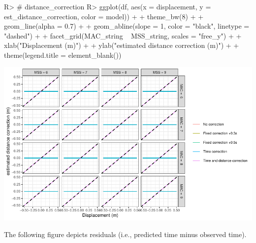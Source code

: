 \documentclass[
]{jss}
\begin{document}
\begin{CodeChunk}
\begin{CodeInput}
R> # distance_correction
R> ggplot(df, aes(x = displacement, y = est_distance_correction, color = model)) +
+   theme_bw(8) +
+   geom_line(alpha = 0.7) +
+   geom_abline(slope = 1, color = "black", linetype = "dashed") +
+   facet_grid(MAC_string ~ MSS_string, scales = "free_y") +
+   xlab("Displacement (m)") +
+   ylab("estimated distance correction (m)") +
+   theme(legend.title = element_blank())
\end{CodeInput}


\begin{center}\includegraphics[width=1\linewidth]{paper_files/figure-latex/unnamed-chunk-53-1} \end{center}

\end{CodeChunk}

The following figure depicts residuals (i.e., predicted time minus observed time).
\end{document}
